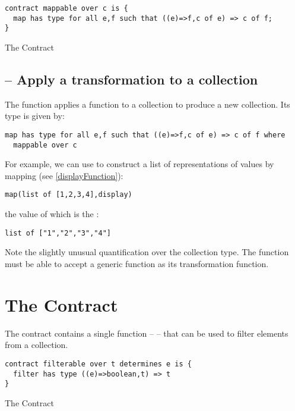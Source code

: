 \begin{program}[H]
\begin{lstlisting}
contract mappable over c is {
  map has type for all e,f such that ((e)=>f,c of e) => c of f;
}
\end{lstlisting}
\caption{The  Contract\label{mapContractProg}}
\end{program}

\subsection{ -- Apply a transformation to a collection}
\label{mapFunction}

The  function applies a function to a collection to produce a new collection. Its type is given by:
\begin{lstlisting}
map has type for all e,f such that ((e)=>f,c of e) => c of f where
  mappable over c
\end{lstlisting}
For example, we can use  to construct a list of  representations of  values by mapping  (see \vref{displayFunction}):

\begin{lstlisting}
map(list of [1,2,3,4],display)
\end{lstlisting}
the value of which is the :
\begin{lstlisting}
list of ["1","2","3","4"]
\end{lstlisting}

Note the slightly unusual quantification over the collection type. The  function must be able to accept a generic function as its transformation function.

\section{The  Contract}
\label{filterableContract}
The  contract contains a single function --  -- that can be used to filter elements from a collection.


\begin{program}[H]
\begin{lstlisting}
contract filterable over t determines e is {
  filter has type ((e)=>boolean,t) => t
}
\end{lstlisting}
\caption{The  Contract\label{filterContractProg}}
\end{program}


